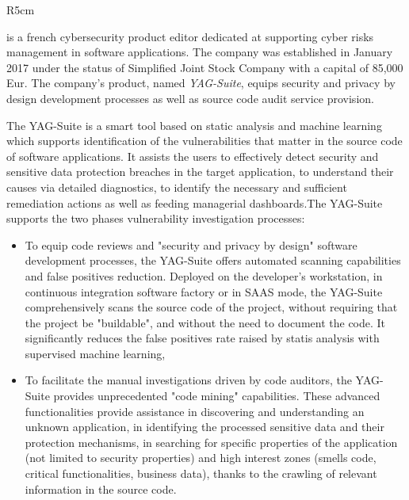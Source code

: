 \documentclass[a4paper,11pt]{article}
\begin{document}
\begin{wrapfigure}{R}{5cm}
\vspace{-2.8cm}
\hfill {}
\vspace{-0.8cm}
\end{wrapfigure}
\label{sec:participantYAG}

\vspace*{0.5cm}

\YAGlong{} is a french cybersecurity product editor dedicated at supporting cyber risks management in software applications. The company was established in January 2017 under the status of Simplified Joint Stock Company with a capital of 85,000 Eur. The company's product, named \textit{YAG-Suite}, equips security and privacy by design development processes as well as source code audit service provision. 

The YAG-Suite is a smart tool based on static analysis and machine learning which supports identification of the vulnerabilities that matter in the source code of software applications. It assists the users to effectively detect security and sensitive data protection breaches in the target application, to understand their causes via detailed diagnostics, to identify the necessary and sufficient remediation actions as well as feeding managerial dashboards.The YAG-Suite supports the two phases vulnerability investigation processes:
\begin{itemize}
\item To equip code reviews and "security and privacy by design" software development processes, the YAG-Suite offers automated scanning capabilities and false positives reduction. Deployed on the developer's workstation, in continuous integration software factory or in SAAS mode, the YAG-Suite comprehensively scans the source code of the project, without requiring that the project be "buildable", and without the need to document the code. It significantly reduces the false positives rate raised by statis analysis with supervised machine learning,
\item To facilitate the manual investigations driven by code auditors, the YAG-Suite provides unprecedented "code mining" capabilities. These advanced functionalities provide assistance in discovering and understanding an unknown application, in identifying the processed sensitive data and their protection mechanisms, in searching for specific properties of the application (not limited to security properties) and high interest zones (smells code, critical functionalities, business data), thanks to the crawling of relevant information in the source code.
\end{itemize}
\end{document}
